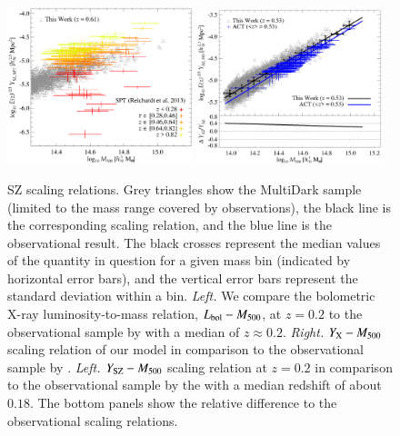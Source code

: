 \documentclass[useAMS,usenatbib]{mn2e}
\begin{document}
\begin{figure} 
\centering
\includegraphics[width=0.48\textwidth]{figures/sz_m_SPT.eps}
\includegraphics[width=0.48\textwidth]{figures/sz_m_ACT.eps}
\caption{SZ scaling relations. Grey triangles show the MultiDark
  sample (limited to the mass range covered by observations), the black line is
  the corresponding scaling relation, and the blue line is the
  observational result. The black crosses represent the median values of the
  quantity in question for a given mass bin (indicated by horizontal error
  bars), and the vertical error bars represent the standard deviation within a
  bin.  \emph{Left.} We compare the bolometric X-ray luminosity-to-mass
  relation, $L_{{\mathrm{bol}}}-M_{500}$, at $z=0.2$ to the observational sample by
  \protect\cite{2010MNRAS.406.1773M} with a median of $z \approx 0.2$. 
  \emph{Right.} $Y_{{\mathrm{X}}}-M_{500}$ scaling relation of our model in comparison to the
  observational sample by \protect\cite{2010MNRAS.406.1773M}. 
  \emph{Left.} $Y_{{\mathrm{SZ}}}-M_{500}$ scaling relation at $z=0.2$ in comparison
  to the observational sample by the \protect\cite{2013arXiv1303.5080P} with a 
  median redshift of about $0.18$. The bottom panels show the relative difference to
  the observational scaling relations.}
\label{fig:SZ_M_1}
\end{figure}
\end{document}
